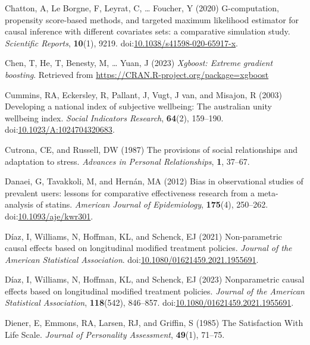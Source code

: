 \documentclass[
  single column]{article}
\newlength{\cslhangindent}
\newenvironment{CSLReferences}[2] %
 {\begin{list}{}{%
  \setlength{\itemindent}{0pt}
  \setlength{\leftmargin}{0pt}
  \setlength{\parsep}{0pt}
  \ifodd #1
   \setlength{\leftmargin}{\cslhangindent}
   \setlength{\itemindent}{-1\cslhangindent}
  \fi
  \setlength{\itemsep}{#2\baselineskip}}}
 {\end{list}}
\begin{document}
\begin{CSLReferences}{1}{0}
Chatton, A, Le Borgne, F, Leyrat, C, \ldots{} Foucher, Y (2020)
G-computation, propensity score-based methods, and targeted maximum
likelihood estimator for causal inference with different covariates
sets: a comparative simulation study. \emph{Scientific Reports},
\textbf{10}(1), 9219.
doi:\href{https://doi.org/10.1038/s41598-020-65917-x}{10.1038/s41598-020-65917-x}.

Chen, T, He, T, Benesty, M, \ldots{} Yuan, J (2023) \emph{Xgboost:
Extreme gradient boosting}. Retrieved from
\url{https://CRAN.R-project.org/package=xgboost}

Cummins, RA, Eckersley, R, Pallant, J, Vugt, J van, and Misajon, R
(2003) Developing a national index of subjective wellbeing: The
australian unity wellbeing index. \emph{Social Indicators Research},
\textbf{64}(2), 159--190.
doi:\href{https://doi.org/10.1023/A:1024704320683}{10.1023/A:1024704320683}.

Cutrona, CE, and Russell, DW (1987) The provisions of social
relationships and adaptation to stress. \emph{Advances in Personal
Relationships}, \textbf{1}, 37--67.

Danaei, G, Tavakkoli, M, and Hernán, MA (2012) Bias in observational
studies of prevalent users: lessons for comparative effectiveness
research from a meta-analysis of statins. \emph{American Journal of
Epidemiology}, \textbf{175}(4), 250--262.
doi:\href{https://doi.org/10.1093/aje/kwr301}{10.1093/aje/kwr301}.

Díaz, I, Williams, N, Hoffman, KL, and Schenck, EJ (2021) Non-parametric
causal effects based on longitudinal modified treatment policies.
\emph{Journal of the American Statistical Association}.
doi:\href{https://doi.org/10.1080/01621459.2021.1955691}{10.1080/01621459.2021.1955691}.

Díaz, I, Williams, N, Hoffman, KL, and Schenck, EJ (2023) Nonparametric
causal effects based on longitudinal modified treatment policies.
\emph{Journal of the American Statistical Association},
\textbf{118}(542), 846--857.
doi:\href{https://doi.org/10.1080/01621459.2021.1955691}{10.1080/01621459.2021.1955691}.

Diener, E, Emmons, RA, Larsen, RJ, and Griffin, S (1985) The
Satisfaction With Life Scale. \emph{Journal of Personality Assessment},
\textbf{49}(1), 71--75.


\end{CSLReferences}
\end{document}
